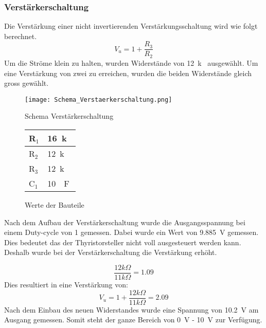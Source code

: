 \subsubsection{Verstärkerschaltung}
Die Verstärkung einer nicht invertierenden Verstärkungsschaltung wird wie folgt berechnet.
\begin{equation}
V_u = 1 + \frac{R_3}{R_2}
\end{equation}
Um die Ströme klein zu halten, wurden Widerstände von \SI{12}{k\Omega} ausgewählt. Um eine Verstärkung von zwei zu erreichen, wurden die beiden Widerstände gleich gross gewählt. 

\newpage
\begin{figure}[ht!]  
	\centering 
	\begin{minipage}[t]{.76\textwidth} \centering 
		\centering
		\texttt{[image: Schema\_Verstaerkerschaltung.png]}	
		\caption{Schema Verstärkerschaltung}\label{fig:Verstaerkerschaltung}
	\end{minipage}	
	\begin{minipage}[b]{.23\textwidth}
		\centering
		\begin{tabular}{|l|l|}
			\hline
			R$_1$ & \SI{16}{k\Omega} 	\\ 	\hline
			R$_2$ & \SI{12}{k\Omega} 	\\ 	\hline
			R$_3$ & \SI{12}{k\Omega} 	\\	\hline
			C$_1$ & \SI{10}{\mu F} 		\\	\hline
		\end{tabular}
		\caption{Werte der Bauteile}
		\label{tab:Verstaerkerschaltung}
	\end{minipage}
\end{figure} 



Nach dem Aufbau der Verstärkerschaltung wurde die Ausgangsspannung bei einem Duty-cycle von 1 gemessen. Dabei wurde ein Wert von \SI{9.885}{V} gemessen. Dies bedeutet das der Thyristorsteller nicht voll ausgesteuert werden kann. Deshalb wurde bei der Verstärkerschaltung die Verstärkung erhöht. 

\begin{equation}
\frac{12k\Omega}{11k\Omega} = 1.09
\end{equation}
Dies resultiert in eine Verstärkung von:
\begin{equation}
V_u = 1 + \frac{12k\Omega}{11k\Omega} = 2.09
\end{equation}
Nach dem Einbau des neuen Widerstandes wurde eine Spannung von \SI{10.2}{V} am Ausgang gemessen. Somit steht der ganze Bereich von \SI{0}{V} - \SI{10}{V} zur Verfügung.

